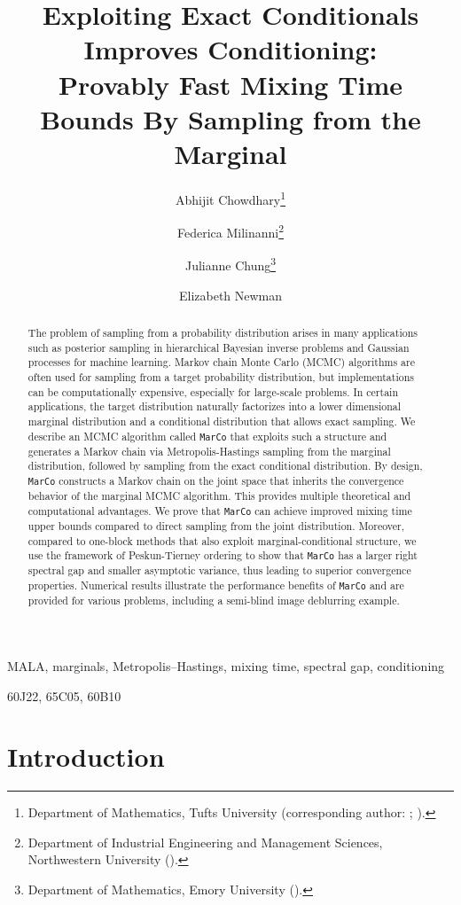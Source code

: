 \documentclass[onefignum,onetabnum]{siamonline250211}
\title{Exploiting Exact Conditionals Improves Conditioning: \\ Provably Fast Mixing Time Bounds By Sampling from the Marginal}
\author{Abhijit Chowdhary\thanks{Department of Mathematics, Tufts University
  (corresponding author: \email{abhijit.chowdhary@tufts.edu};
  \email{e.newman@tufts.edu}).}
\and Federica Milinanni\thanks{Department of Industrial Engineering and Management
  Sciences, Northwestern University
  (\email{federica.milinanni@northwestern.edu}).}
\and Julianne Chung\thanks{Department of Mathematics, Emory University
  (\email{jmchung@emory.edu}).}
\and Elizabeth Newman\footnotemark[1]}
\newcommand{\MarCo}{\textnormal{\texttt{MarCo}}\xspace}
\begin{document}
\maketitle

\begin{abstract}
The problem of sampling from a probability distribution arises in many applications such as posterior sampling in hierarchical Bayesian inverse problems and Gaussian processes for machine learning.
Markov chain Monte Carlo (MCMC) algorithms are often used for sampling from a target probability distribution, but implementations can be computationally expensive, especially for large-scale problems. %
In certain applications, the target distribution naturally factorizes into a lower dimensional marginal distribution and a conditional distribution that allows exact sampling.
We describe an MCMC algorithm called \MarCo that exploits such a structure and generates a Markov chain via Metropolis-Hastings sampling from the marginal distribution, followed by sampling from the exact conditional distribution.
By design, \MarCo constructs a Markov chain on the joint space that inherits the convergence behavior of the marginal MCMC algorithm.
%
%
This provides multiple theoretical and computational advantages.
We prove that \MarCo can achieve improved mixing time upper bounds compared to direct sampling from the joint distribution. %
Moreover, compared to one-block methods that also exploit marginal-conditional structure, we use the framework of Peskun-Tierney ordering to show that \MarCo has a larger right spectral gap and smaller asymptotic variance, thus leading to %
superior convergence properties.
%
%
Numerical results illustrate the performance benefits of \MarCo and are provided for various problems, including a semi-blind image deblurring example.
\end{abstract}

\begin{keywords}
MALA, marginals, Metropolis--Hastings, mixing time, spectral gap, conditioning
\end{keywords}

\begin{MSCcodes}
60J22, 65C05, 60B10
\end{MSCcodes}

\tableofcontents

%
\section{Introduction}
\end{document}
